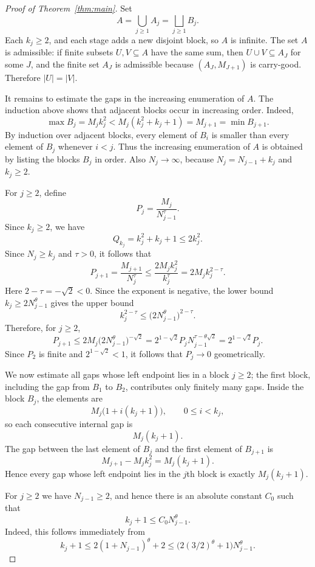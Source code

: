 \documentclass[11pt]{article}
\begin{document}
\begin{proof}[Proof of Theorem~\ref{thm:main}]
Set
\[
        A=\bigcup_{j\ge1} A_j=\bigsqcup_{j\ge1}B_j.
\]
Each $k_j\ge2$, and each stage adds a new disjoint block, so $A$ is infinite.  The set $A$ is admissible: if finite subsets $U,V\subseteq A$ have the same sum, then $U\cup V\subseteq A_J$ for some $J$, and the finite set $A_J$ is admissible because $(A_J,M_{J+1})$ is carry-good.  Therefore $|U|=|V|$.

It remains to estimate the gaps in the increasing enumeration of $A$.  The induction above shows that adjacent blocks occur in increasing order.  Indeed,
\[
        \max B_j=M_j k_j^2<M_j(k_j^2+k_j+1)=M_{j+1}=\min B_{j+1}.
\]
By induction over adjacent blocks, every element of $B_i$ is smaller than every element of $B_j$ whenever $i<j$.  Thus the increasing enumeration of $A$ is obtained by listing the blocks $B_j$ in order.  Also $N_j\to\infty$, because $N_j=N_{j-1}+k_j$ and $k_j\ge2$.

For $j\ge2$, define
\[
        P_j=\frac{M_j}{N_{j-1}^{\tau}}.
\]
Since $k_j\ge2$, we have
\[
        Q_{k_j}=k_j^2+k_j+1\le2k_j^2.
\]
Since $N_j\ge k_j$ and $\tau>0$, it follows that
\[
        P_{j+1}
        =\frac{M_{j+1}}{N_j^\tau}
        \le
        \frac{2M_j k_j^2}{k_j^\tau}
        =2M_j k_j^{2-\tau}.
\]
Here $2-\tau=-\sqrt2<0$.  Since the exponent is negative, the lower bound $k_j\ge2N_{j-1}^{\theta}$ gives the upper bound
\[
        k_j^{2-\tau}\le \bigl(2N_{j-1}^{\theta}\bigr)^{2-\tau}.
\]
Therefore, for $j\ge2$,
\[
        P_{j+1}
        \le
        2M_j\bigl(2N_{j-1}^{\theta}\bigr)^{-\sqrt2}
        =2^{1-\sqrt2}P_jN_{j-1}^{\tau-\theta\sqrt2}
        =2^{1-\sqrt2}P_j.
\]
Since $P_2$ is finite and $2^{1-\sqrt2}<1$, it follows that $P_j\to0$ geometrically.

We now estimate all gaps whose left endpoint lies in a block $j\ge2$; the first block, including the gap from $B_1$ to $B_2$, contributes only finitely many gaps.  Inside the block $B_j$, the elements are
\[
        M_j\bigl(1+i(k_j+1)\bigr),
        \qquad 0\le i<k_j,
\]
so each consecutive internal gap is
\[
        M_j(k_j+1).
\]
The gap between the last element of $B_j$ and the first element of $B_{j+1}$ is
\[
        M_{j+1}-M_j k_j^2=M_j(k_j+1).
\]
Hence every gap whose left endpoint lies in the $j$th block is exactly $M_j(k_j+1)$.

For $j\ge2$ we have $N_{j-1}\ge2$, and hence there is an absolute constant $C_0$ such that
\[
        k_j+1
        \le C_0N_{j-1}^{\theta}.
\]
Indeed, this follows immediately from
\[
        k_j+1
        \le 2(1+N_{j-1})^\theta+2
        \le \bigl(2(3/2)^\theta+1\bigr)N_{j-1}^\theta.
\]


\end{proof}
\end{document}
